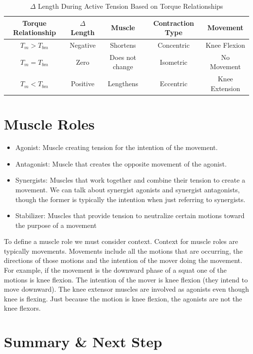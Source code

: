 \begin{table}[h!]
\centering
\begin{tabular}{||c c c c c||} 
 \hline
 Torque Relationship & $\Delta$ Length & Muscle & Contraction Type & Movement\\ [0.5ex] 
 \hline\hline
$T_m > T_{bm}$ & Negative & Shortens & Concentric & Knee Flexion \\
$T_m = T_{bm}$ & Zero & Does not change & Isometric & No Movement\\[1ex] 
$T_m < T_{bm}$ & Positive & Lengthens & Eccentric & Knee Extension \\[1ex] 
 \hline
\end{tabular}
\caption{$\Delta$ Length During Active Tension Based on Torque Relationships}
\label{table:NHE}
\end{table}

\section{Muscle Roles}

\begin{itemize}
\item Agonist: Muscle creating tension for the intention of the movement.
\item Antagonist: Muscle that creates the opposite movement of the agonist.
\item Synergists: Muscles that work together and combine their tension to create a movement. We can talk about synergist agonists and synergist antagonists, though the former is typically the intention when just referring to synergists.
\item Stabilizer: Muscles that provide tension to neutralize certain motions toward the purpose of a movement
\end{itemize}

To define a muscle role we must consider context. Context for muscle roles are typically movements. Movements include all the motions that are occurring, the directions of those motions and the intention of the mover doing the movement. For example, if the movement is the downward phase of a squat one of the motions is knee flexion. The intention of the mover is knee flexion (they intend to move downward). The knee extensor muscles are involved as agonists even though knee is flexing. Just because the motion is knee flexion, the agonists are not the knee flexors.



\section{Summary \& Next Step}

